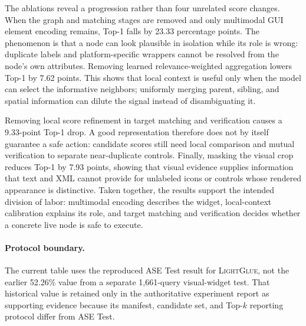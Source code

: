 The ablations reveal a progression rather than four unrelated score changes.
When the graph and matching stages are removed and only multimodal GUI element
encoding remains, Top-1 falls by 23.33 percentage points.  The phenomenon is
that a node can look plausible in isolation while its role is wrong: duplicate
labels and platform-specific wrappers cannot be resolved from the node's own
attributes.  Removing learned relevance-weighted aggregation lowers Top-1 by
7.62 points.  This shows that local context is useful only when the model can
select the informative neighbors; uniformly merging parent, sibling, and
spatial information can dilute the signal instead of disambiguating it.

Removing local score refinement in target matching and verification causes a
9.33-point Top-1 drop.  A good representation therefore does not by itself
guarantee a safe action: candidate scores still need local comparison and
mutual verification to separate near-duplicate controls.  Finally, masking the
visual crop reduces Top-1 by 7.93 points, showing that visual evidence supplies
information that text and XML cannot provide for unlabeled icons or controls
whose rendered appearance is distinctive.  Taken together, the results
support the intended division of labor: multimodal encoding describes the
widget, local-context calibration explains its role, and target matching and
verification decides whether a concrete live node is safe to execute.

\paragraph{Protocol boundary.}
The current table uses the reproduced ASE Test result for \textsc{LightGlue},
not the earlier 52.26\% value from a separate 1,661-query visual-widget test.
That historical value is retained only in the authoritative experiment report
as supporting evidence because its manifest, candidate set, and Top-$k$
reporting protocol differ from ASE Test.
